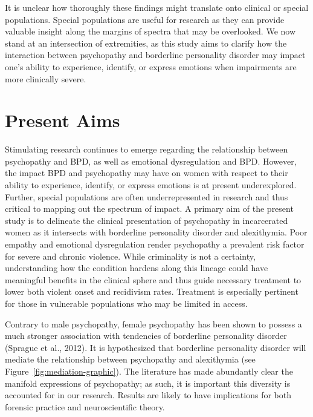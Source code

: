\documentclass[
  man,floatsintext]{apa7}
\begin{document}
It is unclear how thoroughly these findings might translate onto clinical or special populations. Special populations are useful for research as they can provide valuable insight along the margins of spectra that may be overlooked. We now stand at an intersection of extremities, as this study aims to clarify how the interaction between psychopathy and borderline personality disorder may impact one's ability to experience, identify, or express emotions when impairments are more clinically severe.

\hypertarget{present-aims}{%
\section{Present Aims}\label{present-aims}}

Stimulating research continues to emerge regarding the relationship between psychopathy and BPD, as well as emotional dysregulation and BPD. However, the impact BPD and psychopathy may have on women with respect to their ability to experience, identify, or express emotions is at present underexplored. Further, special populations are often underrepresented in research and thus critical to mapping out the spectrum of impact. A primary aim of the present study is to delineate the clinical presentation of psychopathy in incarcerated women as it intersects with borderline personality disorder and alexithymia. Poor empathy and emotional dysregulation render psychopathy a prevalent risk factor for severe and chronic violence. While criminality is not a certainty, understanding how the condition hardens along this lineage could have meaningful benefits in the clinical sphere and thus guide necessary treatment to lower both violent onset and recidivism rates. Treatment is especially pertinent for those in vulnerable populations who may be limited in access.

Contrary to male psychopathy, female psychopathy has been shown to possess a much stronger association with tendencies of borderline personality disorder (Sprague et al., 2012). It is hypothesized that borderline personality disorder will mediate the relationship between psychopathy and alexithymia (see Figure~\ref{fig:mediation-graphic}). The literature has made abundantly clear the manifold expressions of psychopathy; as such, it is important this diversity is accounted for in our research. Results are likely to have implications for both forensic practice and neuroscientific theory.
\end{document}
